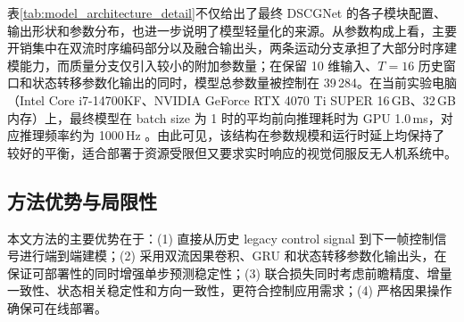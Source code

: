 \documentclass[journal]{IEEEtran}
\begin{document}
\begin{table}[H]
\centering
\caption{所提 DSCGNet 的详细架构（质量分支开启）}
\label{tab:model_architecture_detail}
{
\small
\setlength{\tabcolsep}{2.5pt}
}
\end{table}

表\ref{tab:model_architecture_detail}不仅给出了最终 DSCGNet 的各子模块配置、输出形状和参数分布，也进一步说明了模型轻量化的来源。从参数构成上看，主要开销集中在双流时序编码部分以及融合输出头，两条运动分支承担了大部分时序建模能力，而质量分支仅引入较小的附加参数量；在保留 10 维输入、$T=16$ 历史窗口和状态转移参数化输出的同时，模型总参数量被控制在 39\,284。在当前实验电脑（Intel Core i7-14700KF、NVIDIA GeForce RTX 4070 Ti SUPER 16\,GB、32\,GB 内存）上，最终模型在 batch size 为 1 时的平均前向推理耗时为 GPU 1.0\,ms，对应推理频率约为 1000\,Hz 。由此可见，该结构在参数规模和运行时延上均保持了较好的平衡，适合部署于资源受限但又要求实时响应的视觉伺服反无人机系统中。

\subsection{方法优势与局限性}
本文方法的主要优势在于：(1) 直接从历史 legacy control signal 到下一帧控制信号进行端到端建模；(2) 采用双流因果卷积、GRU 和状态转移参数化输出头，在保证可部署性的同时增强单步预测稳定性；(3) 联合损失同时考虑前瞻精度、增量一致性、状态相关稳定性和方向一致性，更符合控制应用需求；(4) 严格因果操作确保可在线部署。
\end{document}
